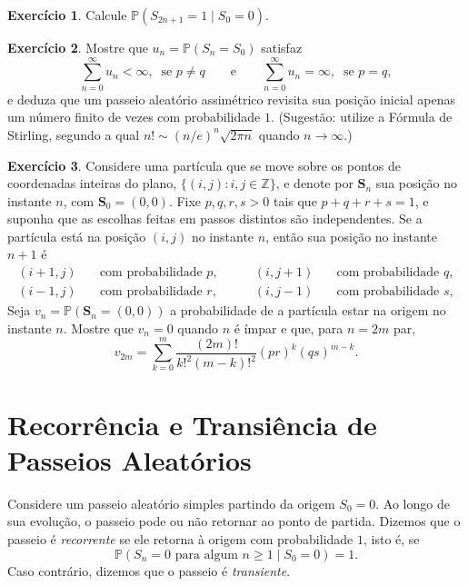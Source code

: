 \documentclass[12pt,portuguese]{article}
\theoremstyle{definition}
\theoremstyle{plainexercise}
\newtheorem{exercise}{Exercício}
\theoremstyle{starredexercise}
\theoremstyle{definition}
\begin{document}
\begin{exercise}\label{exercise:s2n1-um}
Calcule $\mathbb{P}(S_{2n+1} = 1 \mid S_0 = 0)$.
\end{exercise}

\begin{exercise}\label{exercise:soma-un-stirling}
Mostre que $u_n = \mathbb{P}(S_n = S_0)$ satisfaz
\[
  \sum_{n=0}^{\infty} u_n < \infty, \ \text{ se } p \neq q
  \qquad \text{e} \qquad
  \sum_{n=0}^{\infty} u_n = \infty, \ \text{ se } p = q,
\]
e deduza que um passeio aleatório assimétrico revisita sua posição inicial
apenas um número finito de vezes com probabilidade $1$. (Sugestão: utilize a
Fórmula de Stirling, segundo a qual $n! \sim (n/e)^n \sqrt{2\pi n}$ quando
$n \to \infty$.)
\end{exercise}

\begin{exercise}\label{exercise:passeio-2d}
Considere uma partícula que se move sobre os pontos de coordenadas inteiras do
plano, $\{(i, j) : i, j \in \mathbb{Z}\}$, e denote por $\mathbf{S}_n$ sua
posição no instante $n$, com $\mathbf{S}_0 = (0, 0)$. Fixe $p, q, r, s > 0$
tais que $p + q + r + s = 1$, e suponha que as escolhas feitas em passos
distintos são independentes. Se a partícula está na posição $(i, j)$ no
instante $n$, então sua posição no instante $n + 1$ é
\[
  \begin{aligned}
    (i + 1, j) &\quad \text{com probabilidade } p, \qquad &
    (i, j + 1) &\quad \text{com probabilidade } q, \\
    (i - 1, j) &\quad \text{com probabilidade } r, \qquad &
    (i, j - 1) &\quad \text{com probabilidade } s,
  \end{aligned}
\]
Seja
$v_n = \mathbb{P}(\mathbf{S}_n = (0, 0))$ a probabilidade de a partícula
estar na origem no instante $n$. Mostre que $v_n = 0$ quando $n$ é ímpar e
que, para $n = 2m$ par,
\[
  v_{2m} = \sum_{k=0}^{m} \frac{(2m)!}{k!^2 (m - k)!^2} (pr)^k (qs)^{m-k}.
\]
\end{exercise}

\section{Recorrência e Transiência de Passeios Aleatórios}\label{sec:recorrencia-transiencia}

Considere um passeio aleatório simples partindo da origem $S_0 = 0$. Ao longo de
sua evolução, o passeio pode ou não retornar ao ponto de partida. Dizemos que o
passeio é \emph{recorrente} se ele retorna à origem com probabilidade $1$, isto
é, se
\[
\mathbb{P}(S_n = 0 \text{ para algum } n \geqslant 1 \mid S_0 = 0) = 1.
\]
Caso contrário, dizemos que o passeio é \emph{transiente}.
\end{document}
